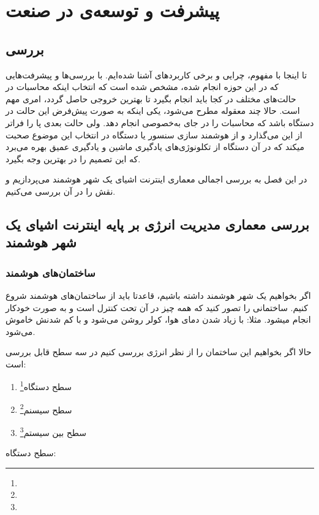\chapter{پیشرفت و توسعه‌ی  در صنعت}

\section{بررسی }
تا اینجا با مفهوم، چرایی و برخی کاربردهای  آشنا شده‌ایم.
با بررسی‌ها و پیشرفت‌هایی که در این حوزه انجام شده، مشخص شده است که انتخاب اینکه محاسبات در حالت‌های مختلف در کجا باید انجام بگیرد تا بهترین خروجی حاصل گردد، امری مهم است.
حالا چند معقوله مطرح می‌شود، یکی اینکه به صورت پیش‌فرض این حالت در دستگاه باشد که محاسبات را در جای به‌خصوصی انجام دهد.
ولی حالت بعدی پا را فراتر از این می‌گذارد و از هوشمند سازی سنسور یا دستگاه در انتخاب این موضوع صحبت میکند که در آن دستگاه از تکلونوژی‌های یادگیری ماشین و یادگیری عمیق بهره می‌برد که این تصمیم را در بهترین وجه بگیرد.

در این فصل به بررسی اجمالی معماری اینترنت اشیای یک شهر هوشمند می‌پردازیم و نقش  را در آن بررسی می‌کنیم.

\section{بررسی معماری مدیریت انرژی بر پایه اینترنت اشیای یک شهر هوشمند\cite{liu2019intelligent}}
\subsection{ساختمان‌های هوشمند}
اگر بخواهیم یک شهر هوشمند داشته باشیم، قاعدتا باید از ساختمان‌های هوشمند شروع کنیم.
ساختمانی را تصور کنید که همه چیز در آن تحت کنترل است و به صورت خودکار انجام میشود. مثلا: با زیاد شدن دمای هوا، کولر روشن می‌شود و با کم شدنش خاموش می‌شود.

حالا اگر بخواهیم این ساختمان را از نظر انرژی بررسی کنیم در سه سطح قابل بررسی است:


\begin{enumerate}
    \item سطح دستگاه\footnote{}
    \item سطح سیسنم\footnote{}
    \item سطح بین سیستم\footnote{}
\end{enumerate}

سطح دستگاه:

